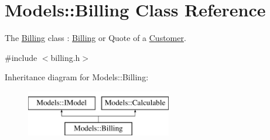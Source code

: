 \hypertarget{classModels_1_1Billing}{}\section{Models\+:\+:Billing Class Reference}
\label{classModels_1_1Billing}


The \hyperlink{classModels_1_1Billing}{Billing} class \+: \hyperlink{classModels_1_1Billing}{Billing} or Quote of a \hyperlink{classModels_1_1Customer}{Customer}.  




{\ttfamily \#include $<$billing.\+h$>$}

Inheritance diagram for Models\+:\+:Billing\+:\begin{figure}[H]
\begin{center}
\leavevmode
\includegraphics[height=2.000000cm]{d4/d5c/classModels_1_1Billing}
\end{center}
\end{figure}
